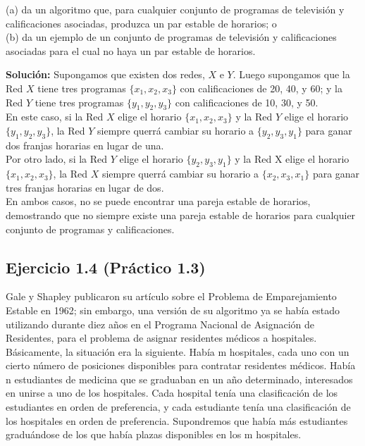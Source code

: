 \documentclass{article}
\begin{document}
(a) da un algoritmo que, para cualquier conjunto de programas de televisión y calificaciones asociadas, produzca un par estable de horarios; o\\

(b) da un ejemplo de un conjunto de programas de televisión y calificaciones asociadas para el cual no haya un par estable de horarios.\\

\newpage

\textbf{Solución:} Supongamos que existen dos redes, $X$ e $Y$. Luego supongamos que la Red $X$ tiene tres programas $\{x_1, x_2, x_3\}$ con calificaciones de 20, 40, y 60; y la Red $Y$ tiene tres programas $\{y_1, y_2, y_3\}$ con calificaciones de 10, 30, y 50.\\

En este caso, si la Red $X$ elige el horario $\{x_1, x_2, x_3\}$ y la Red $Y$ elige el horario $\{y_1, y_2, y_3\}$, la Red $Y$ siempre querrá cambiar su horario a $\{y_2, y_3, y_1\}$ para ganar dos franjas horarias en lugar de una.\\

Por otro lado, si la Red $Y$ elige el horario $\{y_2, y_3, y_1\}$ y la Red X elige el horario $\{x_1, x_2, x_3\}$, la Red $X$ siempre querrá cambiar su horario a $\{x_2, x_3, x_1\}$ para ganar tres franjas horarias en lugar de dos.\\

En ambos casos, no se puede encontrar una pareja estable de horarios, demostrando que no siempre existe una pareja estable de horarios para cualquier conjunto de programas y calificaciones.


\subsection{Ejercicio 1.4 (Práctico 1.3) }
Gale y Shapley publicaron su artículo sobre el Problema de Emparejamiento Estable en 1962; sin embargo, una versión de su algoritmo ya se había estado utilizando durante diez años en el Programa Nacional de Asignación de Residentes, para el problema de asignar residentes médicos a hospitales.\\

Básicamente, la situación era la siguiente. Había m hospitales, cada uno con un cierto número de posiciones disponibles para contratar residentes médicos. Había n estudiantes de medicina que se graduaban en un año determinado, interesados en unirse a uno de los hospitales. Cada hospital tenía una clasificación de los estudiantes en orden de preferencia, y cada estudiante tenía una clasificación de los hospitales en orden de preferencia. Supondremos que había más estudiantes graduándose de los que había plazas disponibles en los m hospitales.\\
\end{document}
